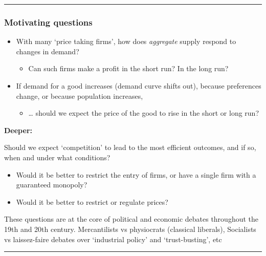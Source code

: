 \documentclass[]{article}
\providecommand{\tightlist}{%
  \setlength{\itemsep}{0pt}\setlength{\parskip}{0pt}}
\begin{document}
\begin{center}\rule{0.5\linewidth}{\linethickness}\end{center}

\hypertarget{motivating-questions}{%
\subsubsection{Motivating questions}\label{motivating-questions}}

\begin{itemize}
\tightlist
\item
  With many `price taking firms', how does \emph{aggregate} supply
  respond to changes in demand?

  \begin{itemize}
  \tightlist
  \item
    Can such firms make a profit in the short run? In the long run?
  \end{itemize}
\item
  If demand for a good increases (demand curve shifts out), because
  preferences change, or because population increases,

  \begin{itemize}
  \tightlist
  \item
    \ldots{} should we expect the price of the good to rise in the short
    or long run?
  \end{itemize}
\end{itemize}

\bigskip

\textbf{Deeper:}

Should we expect `competition' to lead to the most efficient outcomes,
and if so, when and under what conditions?

\begin{itemize}
\item
  Would it be better to restrict the entry of firms, or have a single
  firm with a guaranteed monopoly?
\item
  Would it be better to restrict or regulate prices?
\end{itemize}

These questions are at the core of political and economic debates
throughout the 19th and 20th century. Mercantilists vs physiocrats
(classical liberals), Socialists vs laissez-faire debates over
`industrial policy' and `trust-busting', etc

\begin{center}\rule{0.5\linewidth}{\linethickness}\end{center}
\end{document}
